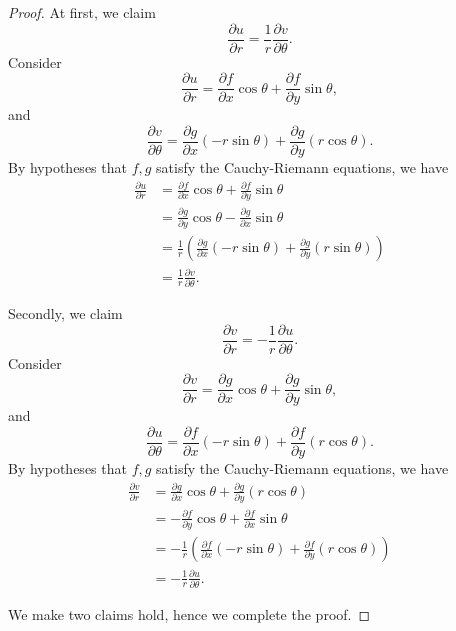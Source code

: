 \begin{Exercise}
\begin{proof}
At first, we claim
$$
\frac{\partial u}{\partial r} = \frac{1}{r}\frac{\partial v}{\partial \theta}.
$$
Consider
$$
\frac{\partial u}{\partial r} = \frac{\partial f}{\partial x}\cos \theta + \frac{\partial f}{\partial y}\sin \theta,
$$
and
$$
\frac{\partial v}{\partial \theta} = \frac{\partial g}{\partial x}(-r\sin\theta) + \frac{\partial g}{\partial y}(r\cos \theta).
$$
By hypotheses that $f,g$ satisfy the Cauchy-Riemann equations, we have
\begin{align*}
\frac{\partial u}{\partial r}
&= \frac{\partial f}{\partial x}\cos \theta + \frac{\partial f}{\partial y}\sin \theta \\
&= \frac{\partial g}{\partial y}\cos \theta - \frac{\partial g}{\partial x}\sin \theta \\
&= \frac{1}{r}\left( \frac{\partial g}{\partial x}(-r\sin \theta) + \frac{\partial g}{\partial y}(r\sin \theta) \right) \\
&= \frac{1}{r}\frac{\partial v}{\partial \theta}.
\end{align*}

Secondly, we claim
$$
\frac{\partial v}{\partial r} = -\frac{1}{r}\frac{\partial u}{\partial \theta}.
$$
Consider
$$
\frac{\partial v}{\partial r} = \frac{\partial g}{\partial x}\cos \theta + \frac{\partial g}{\partial y}\sin \theta,
$$
and
$$
\frac{\partial u}{\partial \theta} = \frac{\partial f}{\partial x}(-r\sin\theta) + \frac{\partial f}{\partial y}(r\cos\theta).
$$
By hypotheses that $f,g$ satisfy the Cauchy-Riemann equations, we have
\begin{align*}
\frac{\partial v}{\partial r}
&= \frac{\partial g}{\partial x}\cos\theta + \frac{\partial g}{\partial y}(r\cos\theta) \\
&= -\frac{\partial f}{\partial y}\cos\theta + \frac{\partial f}{\partial x}\sin\theta \\
&= -\frac{1}{r}\left( \frac{\partial f}{\partial x}(-r\sin\theta) + \frac{\partial f}{\partial y}(r\cos\theta) \right) \\
&= -\frac{1}{r}\frac{\partial u}{\partial \theta}.
\end{align*}

We make two claims hold, hence we complete the proof.
\end{proof}
\end{Exercise}